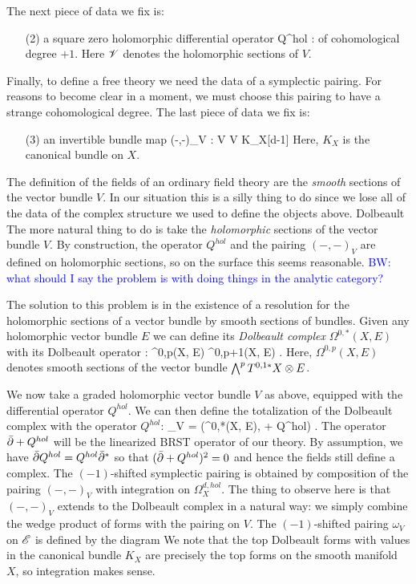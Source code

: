 \documentclass[10pt]{amsart}
\def\brian{\textcolor{blue}{BW: }\textcolor{blue}}
\begin{document}
The next piece of data we fix is:
\begin{itemize}
\item[(2)] a square zero holomorphic differential operator 
\ben
Q^{hol} : \sV \to \sV[-1]
\een
of cohomological degree $+1$. 
Here $\mathscr V$ denotes the holomorphic sections of $V$. 
\end{itemize}

Finally, to define a free theory we need the data of a symplectic pairing. 
For reasons to become clear in a moment, we must choose this pairing to have a strange cohomological degree. 
The last piece of data we fix is:
\begin{itemize}
\item[(3)] an invertible bundle map
\ben
(-,-)_V : V \tensor V \to K_X[d-1]
\een
Here, $K_X$ is the canonical bundle on $X$. 
\end{itemize}

The definition of the fields of an ordinary field theory are the {\em smooth} sections of the vector bundle $V$. 
In our situation this is a silly thing to do since we lose all of the data of the complex structure we used to define the objects above. Dolbeault
The more natural thing to do is take the {\em holomorphic} sections of the vector bundle $V$. 
By construction, the operator $Q^{hol}$ and the pairing $(-,-)_V$ are defined on holomorphic sections, so on the surface this seems reasonable. 
\brian{what should I say the problem is with doing things in the analytic category?}

The solution to this problem is in the existence of a resolution for the holomorphic sections of a vector bundle by smooth sections of bundles. 
Given any holomorphic vector bundle $E$ we can define its {\em Dolbeault complex} $\Omega^{0,*}(X , E)$ with its Dolbeault operator 
\ben
\dbar : \Omega^{0,p}(X, E) \to \Omega^{0,p+1}(X, E) .
\een
Here, $\Omega^{0,p}(X, E)$ denotes smooth sections of the vector bundle $\bigwedge^p T^{0,1*} X \otimes E$. 

We now take a graded holomorphic vector bundle $V$ as above, equipped with the differential operator $Q^{hol}$. 
We can then define the totalization of the Dolbeault complex with the operator $Q^{hol}$:
\ben
\sE_V = \left(\Omega^{0,*}(X, E), \dbar + Q^{hol}\right) .
\een
The operator $\Bar{\partial} + Q^{hol}$ will be the linearized BRST operator of our theory.
By assumption, we have $\Bar{\partial} Q^{hol} = Q^{hol} \Bar{\partial}^*$ so that $(\Bar{\partial} + Q^{hol})^2 = 0$ and hence the fields still define a complex. 
The $(-1)$-shifted symplectic pairing is obtained by composition of the pairing $(-,-)_V$ with integration on $\Omega^{d,hol}_X$. 
The thing to observe here is that $(-,-)_V$ extends to the Dolbeault complex in a natural way: we simply combine the wedge product of forms with the pairing on $V$.
The $(-1)$-shifted pairing $\omega_V$ on $\mathscr E$ is defined by the diagram
\ben
{}
\een
We note that the top Dolbeault forms with values in the canonical bundle $K_X$ are precisely the top forms on the smooth manifold $X$, so integration makes sense. 
\end{document}
